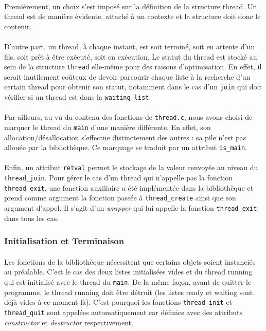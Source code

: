 \paragraph{} 
Premièrement, un choix s'est imposé sur la définition de
la structure thread. Un thread est de manière évidente, attaché à un
contexte et la structure doit donc le contenir.

\paragraph{} 
D'autre part, un thread, à chaque instant, est soit terminé, soit en
attente d'un fils, soit prêt à être exécuté, soit en exécution. Le statut du
thread est stocké au sein de la structure \texttt{thread} elle-même
pour des raisons d'optimisation. En effet, il serait inutilement
coûteux de devoir parcourir chaque liste à la recherche d'un certain
thread pour obtenir son statut, notamment dans le cas d'un
\texttt{join} qui doit vérifier si un thread est dans la
\texttt{waiting\_list}.

\paragraph{} 
Par ailleurs, au vu du contenu des fonctions de
\texttt{thread.c}, nous avons choisi de marquer le thread du
\texttt{main} d'une manière différente. En effet, son
allocation/désallocation s'effectue distinctement des autres : sa pile
n'est pas allouée par la bibliothèque. Ce marquage se traduit par un
attribut \texttt{is\_main}.

\paragraph{}
Enfin, un attribut \texttt{retval} permet le stockage de
la valeur renvoyée au niveau du \texttt{thread\_join}. Pour gérer le
cas d'un thread qui n'appelle pas la fonction \texttt{thread\_exit},
une fonction auxiliaire a été implémentée dans la bibliothèque et
prend comme argument la fonction passée à \texttt{thread\_create}
ainsi que son argument d'appel. Il s'agit d'un \emph{wrapper} qui lui
appelle la fonction \texttt{thread\_exit} dans tous les cas.

\subsubsection{Initialisation et Terminaison}

\paragraph{}
Les fonctions de la bibliothèque nécessitent que
certains objets soient instanciés au préalable. C'est le cas des deux
listes initialisées vides et du thread running qui est initialisé avec le thread du
\texttt{main}. De la même façon, avant de quitter le programme, le
thread running doit être détruit (les listes ready et waiting sont
déjà vides à ce moment là). C'est pourquoi les
fonctions \texttt{thread\_init} et \texttt{thread\_quit} sont
appelées automatiquement car définies avec des attributs
\emph{constructor} et \emph{destructor} respectivement.

